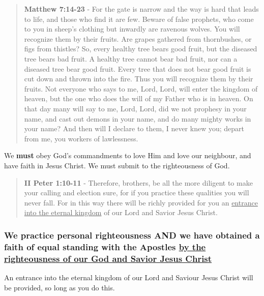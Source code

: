 \documentclass[11pt]{article}
\begin{document}
\begin{quote}
\textbf{Matthew 7:14-23} - For the gate is narrow and the way is hard that leads to life, and those who find it are few.  Beware of false prophets, who come to you in sheep's clothing but inwardly are ravenous wolves.  You will recognize them by their fruits. Are grapes gathered from thornbushes, or figs from thistles?  So, every healthy tree bears good fruit, but the diseased tree bears bad fruit.  A healthy tree cannot bear bad fruit, nor can a diseased tree bear good fruit.  Every tree that does not bear good fruit is cut down and thrown into the fire.  Thus you will recognize them by their fruits.  Not everyone who says to me, Lord, Lord, will enter the kingdom of heaven, but the one who does the will of my Father who is in heaven.  On that day many will say to me, Lord, Lord, did we not prophesy in your name, and cast out demons in your name, and do many mighty works in your name?  And then will I declare to them, I never knew you; depart from me, you workers of lawlessness.
\end{quote}

We \textbf{must} obey God's commandments to love Him and love our neighbour, and have faith in Jesus Christ.
We must submit to the righteousness of God.

\begin{quote}
\textbf{II Peter 1:10-11} - Therefore, brothers, be all the more diligent to make your calling and election sure, for if you practice these qualities you will never fall. For in this way there will be richly provided for you an \uline{entrance into the eternal kingdom} of our Lord and Savior Jesus Christ.
\end{quote}

\subsubsection{We practice personal righteousness AND we have obtained a faith of equal standing with the Apostles \underline{by the righteousness of our God and Savior Jesus Christ}}
\label{sec:orgc5bb342}
An entrance into the eternal kingdom of our Lord and Saviour Jesus Christ will
be provided, so long as you do this.
\end{document}
